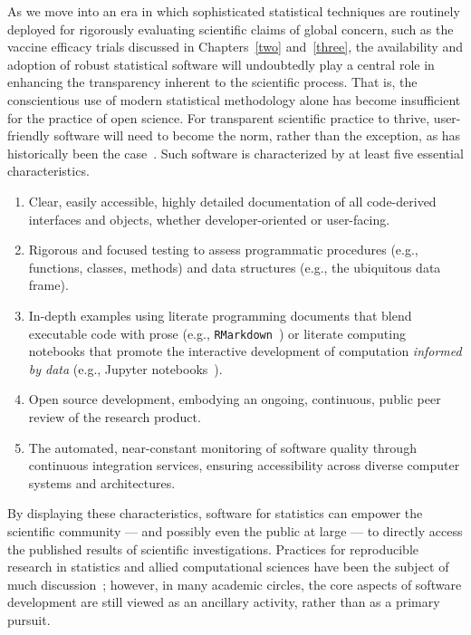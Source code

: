 As we move into an era in which sophisticated statistical techniques are
routinely deployed for rigorously evaluating scientific claims of global
concern, such as the vaccine efficacy trials discussed in Chapters~\ref{two}
and~\ref{three}, the availability and adoption of robust statistical software
will undoubtedly play a central role in enhancing the transparency inherent to
the scientific process. That is, the conscientious use of modern statistical
methodology alone has become insufficient for the practice of open science. For
transparent scientific practice to thrive, user-friendly software will need to
become the norm, rather than the exception, as has historically been the
case~\citep{stromberg2004write, pullenayegum2016knowledge}. Such software is
characterized by at least five essential characteristics.
\begin{enumerate}[topsep=0.5pt,itemsep=0pt,partopsep=1ex,parsep=1ex]
  \item Clear, easily accessible, highly detailed documentation of all
       code-derived interfaces and objects, whether developer-oriented or
       user-facing.
   \item Rigorous and focused testing to assess programmatic procedures (e.g.,
       functions, classes, methods) and data structures (e.g., the
       ubiquitous data frame).
  \item In-depth examples using literate programming documents that blend
      executable code with prose (e.g., \texttt{RMarkdown}~\citep{xie2018r}) or
      literate computing notebooks that promote the interactive development of
      computation \textit{informed by data} (e.g., Jupyter
      notebooks~\citep{kluyver2016jupyter, granger2021jupyter}).
  \item Open source development, embodying an ongoing, continuous, public
       peer review of the research product.
  \item The automated, near-constant monitoring of software quality through
      continuous integration services, ensuring accessibility across diverse
      computer systems and architectures.
\end{enumerate}
By displaying these characteristics, software for statistics can empower the
scientific community --- and possibly even the public at large --- to directly
access the published results of scientific investigations. Practices for
reproducible research in statistics and allied computational sciences have been
the subject of much discussion~\citep[e.g.,][]{peng2009reproducible,
peng2011reproducible, stodden2014implementing, kitzes2017practice,
millman2018developing}; however, in many academic circles, the core aspects of
software development are still viewed as an ancillary activity, rather than as
a primary pursuit.

